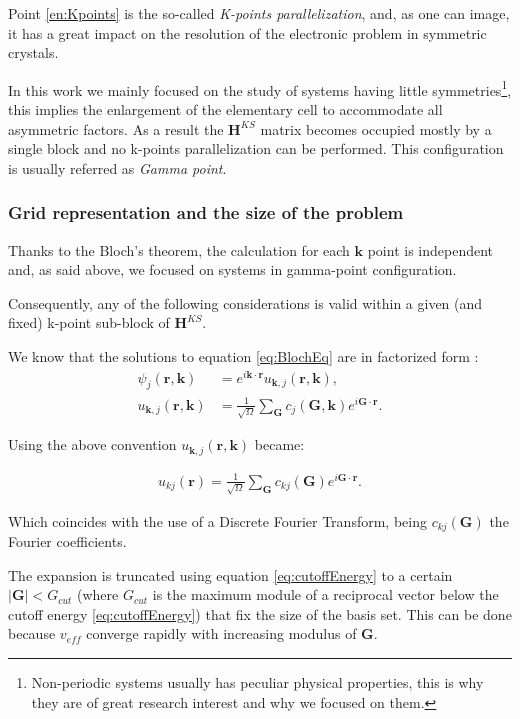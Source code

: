 \documentclass[a4paper,12pt]{article}
\newcommand\mf[1]{\mathbf{#1}}
\newcommand\erre{\mathbf{r}}
\newcommand\GI{\mathbf{G}}
\begin{document}
Point \ref{en:Kpoints} is the so-called \textit{K-points parallelization}, and, as one can image, it has a great impact on the resolution of the electronic problem in symmetric crystals.

In this work we mainly focused on the study of systems having little symmetries\footnote{Non-periodic systems usually has peculiar physical properties, this is why they are of great research interest and why we focused on them.}, this implies the enlargement of the elementary cell to accommodate all asymmetric factors. 
As a result the $\mf{H}^{KS}$ matrix becomes occupied mostly by a single block and no k-points parallelization can be performed.
This configuration is usually referred as \textit{Gamma point}.



\subsubsection{Grid representation and the size of the problem} \label{sec:Grid}

Thanks to the Bloch's theorem, the calculation for each $\mf{k}$ point is independent and, as said above, we focused on systems in gamma-point configuration. 

Consequently, any of the following considerations is valid within a given (and fixed) k-point sub-block of $\mf{H}^{KS}$.

We know that the solutions to equation \eqref{eq:BlochEq} are in factorized form :
\begin{align}
	\psi_{j}(\erre,\mf{k}) &= e^{i \mf{k} \cdot	 \erre} u_{\mf{k},j}(\erre,\mf{k}), \\
	u_{\mf{k},j}(\erre,\mf{k}) &= \frac{1}{\sqrt{\Omega}} \sum_{\GI} c_{j}(\GI,\mf{k})e^{i \GI \cdot \erre}.
\end{align}

Using the above convention $u_{\mf{k},j}(\erre,\mf{k})$ became:

\begin{align}
	u_{kj}(\erre) = \frac{1}{\sqrt{\Omega}} \sum_{\GI} c_{kj}(\GI)e^{i \GI \cdot \erre}.
\end{align}

Which coincides with the use of a Discrete Fourier Transform, being $c_{kj}(\GI)$ the Fourier coefficients.

The expansion is truncated using equation \eqref{eq:cutoffEnergy} to a certain $\mid \GI \mid < G_{cut}$ (where $G_{cut}$ is the maximum module of a reciprocal vector below the cutoff energy \eqref{eq:cutoffEnergy}) that fix the size of the basis set. This can be done because $v_{eff}$ converge rapidly with increasing modulus of $\GI$.
\end{document}
